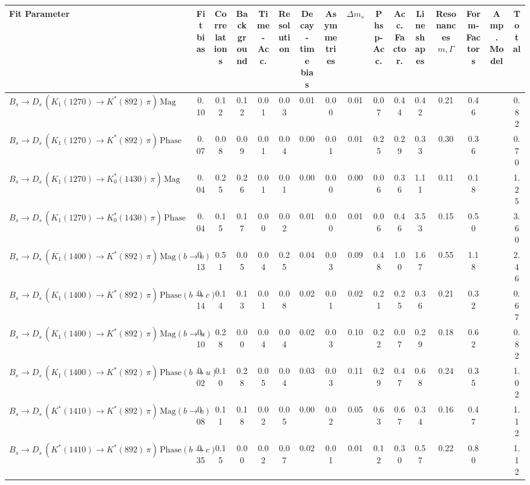 \begin{tabular}{l  c  c  c  c  c  c  c  c  c  c  c  c  c  c  | c }
\hline
\hline
Fit Parameter & Fit bias & Correlations & Background & Time-Acc. & Resolution & Decay-time bias & Asymmetries & $\Delta m_{s}$ & Phsp-Acc. & Acc. Factor. & Lineshapes & Resonances $m,\Gamma$ & Form-Factors & Amp. Model &  Total  \\ 
\hline
$B_s \to D_s \, ( K_1(1270) \to K^{*}(892) \, \pi ) \, \text{Mag}$ & 0.10 & 0.12 & 0.12 & 0.01 & 0.03 & 0.01 & 0.00 & 0.01 & 0.07 & 0.44 & 0.42 & 0.21 & 0.46 &  & 0.82 \\ 
$B_s \to D_s \, ( K_1(1270) \to K^{*}(892) \, \pi ) \, \text{Phase}$ & 0.07 & 0.08 & 0.09 & 0.01 & 0.04 & 0.00 & 0.01 & 0.01 & 0.25 & 0.29 & 0.33 & 0.30 & 0.36 &  & 0.70 \\ 
$B_s \to D_s \, ( K_1(1270) \to K^{*}_{0}(1430) \, \pi ) \, \text{Mag} $ & 0.04 & 0.25 & 0.26 & 0.01 & 0.01 & 0.00 & 0.00 & 0.00 & 0.06 & 0.36 & 1.11 & 0.11 & 0.18 &  & 1.25 \\ 
$B_s \to D_s \, ( K_1(1270) \to K^{*}_{0}(1430) \, \pi ) \, \text{Phase} $ & 0.04 & 0.15 & 0.17 & 0.00 & 0.02 & 0.01 & 0.00 & 0.01 & 0.06 & 0.46 & 3.53 & 0.15 & 0.50 &  & 3.60 \\ 
$B_s \to D_s \, ( K_1(1400) \to K^{*}(892) \, \pi ) \, \text{Mag} (b \to c)$ & 0.13 & 0.51 & 0.05 & 0.04 & 0.25 & 0.04 & 0.03 & 0.09 & 0.48 & 1.00 & 1.67 & 0.55 & 1.18 &  & 2.46 \\ 
$B_s \to D_s \, ( K_1(1400) \to K^{*}(892) \, \pi ) \, \text{Phase} (b \to c)$ & 0.14 & 0.14 & 0.13 & 0.01 & 0.08 & 0.02 & 0.01 & 0.02 & 0.21 & 0.25 & 0.36 & 0.21 & 0.32 &  & 0.67 \\ 
$B_s \to D_s \, ( K_1(1400) \to K^{*}(892) \, \pi ) \, \text{Mag} (b \to u)$ & 0.10 & 0.28 & 0.00 & 0.04 & 0.04 & 0.02 & 0.03 & 0.10 & 0.22 & 0.07 & 0.29 & 0.18 & 0.62 &  & 0.82 \\ 
$B_s \to D_s \, ( K_1(1400) \to K^{*}(892) \, \pi ) \, \text{Phase} (b \to u)$ & 0.02 & 0.10 & 0.28 & 0.05 & 0.04 & 0.03 & 0.03 & 0.11 & 0.29 & 0.47 & 0.68 & 0.24 & 0.35 &  & 1.02 \\ 
$B_s \to D_s \, ( K^{*}(1410) \to K^{*}(892) \, \pi ) \, \text{Mag} (b \to c)$ & 0.08 & 0.11 & 0.18 & 0.02 & 0.05 & 0.00 & 0.02 & 0.05 & 0.63 & 0.67 & 0.34 & 0.16 & 0.47 &  & 1.12 \\ 
$B_s \to D_s \, ( K^{*}(1410) \to K^{*}(892) \, \pi ) \, \text{Phase} (b \to c)$ & 0.35 & 0.15 & 0.00 & 0.02 & 0.07 & 0.02 & 0.01 & 0.01 & 0.12 & 0.30 & 0.57 & 0.22 & 0.80 &  & 1.12 \\ 

\end{tabular}
